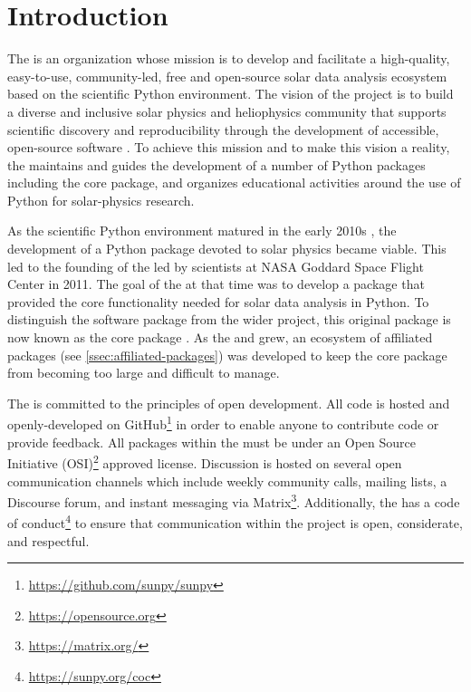 \section{Introduction}
\label{sec:introduction}

The \sunpyproj is an organization whose mission is to develop and facilitate a high-quality, easy-to-use, community-led, free and open-source solar data analysis ecosystem based on the scientific Python environment.
The vision of the project is to build a diverse and inclusive solar physics and heliophysics community that supports scientific discovery and  reproducibility through the development of accessible, open-source software \citep{bobra_monica_2020_7020094}.
To achieve this mission and to make this vision a reality, the \sunpyproj maintains and guides the development of a number of Python packages including the \sunpypkg core package, and organizes educational activities around the use of Python for solar-physics research.

As the scientific Python environment matured in the early 2010s \citep{Hunter:2007, harris2020array, 2020SciPy-NMeth}, the development of a Python package devoted to solar physics became viable.
This led to the founding of the \sunpyproj led by scientists at NASA Goddard Space Flight Center in 2011.
The goal of the \sunpyproj at that time was to develop a package that provided the core functionality needed for solar data analysis in Python.
To distinguish the software package from the wider project, this original package is now known as the \sunpypkg core package \citep{sunpy_community2020}.
As the \sunpyproj and \sunpypkg grew, an ecosystem of affiliated packages (see \autoref{ssec:affiliated-packages}) was developed to keep the \sunpypkg core package from becoming too large and difficult to manage.

The \sunpyproj is committed to the principles of open development.
All code is hosted and openly-developed on GitHub\footnote{\url{https://github.com/sunpy/sunpy}} in order to enable anyone to contribute code or provide feedback.
All packages within the \sunpyproj must be under an Open Source Initiative (OSI)\footnote{\url{https://opensource.org}} approved license.
Discussion is hosted on several open communication channels which include weekly community calls, mailing lists, a Discourse forum, and instant messaging via Matrix\footnote{\url{https://matrix.org/}}.
Additionally, the \sunpyproj has a code of conduct\footnote{\url{https://sunpy.org/coc}} to ensure that communication within the project is open, considerate, and respectful.

